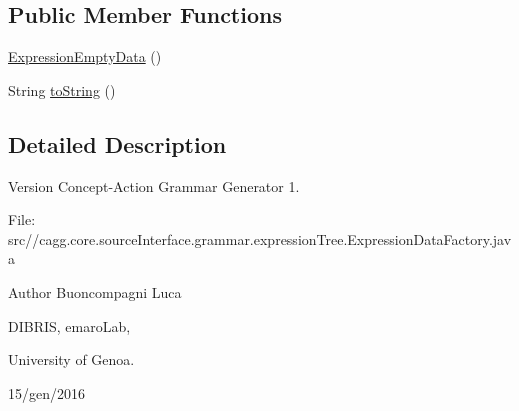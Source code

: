 \subsection*{Public Member Functions}
\begin{DoxyCompactItemize}
\item 
\hyperlink{classit_1_1emarolab_1_1cagg_1_1core_1_1language_1_1syntax_1_1expressionTree_1_1ExpressionDataFactory_1_1ExpressionEmptyData_af3ba57a25a32db8f8fd0d7d740e0f0b9}{Expression\-Empty\-Data} ()
\item 
String \hyperlink{classit_1_1emarolab_1_1cagg_1_1core_1_1language_1_1syntax_1_1expressionTree_1_1ExpressionDataFactory_1_1ExpressionEmptyData_a71f15f6bfbcb942d230ae91a9ea91f91}{to\-String} ()
\end{DoxyCompactItemize}


\subsection{Detailed Description}
\begin{DoxyVersion}{Version}
Concept-\/\-Action Grammar Generator 1. \par
 File\-: src//cagg.core.\-source\-Interface.\-grammar.\-expression\-Tree.\-Expression\-Data\-Factory.\-java \par

\end{DoxyVersion}
\begin{DoxyAuthor}{Author}
Buoncompagni Luca \par
 D\-I\-B\-R\-I\-S, emaro\-Lab,\par
 University of Genoa. \par
 15/gen/2016 \par

\end{DoxyAuthor}


